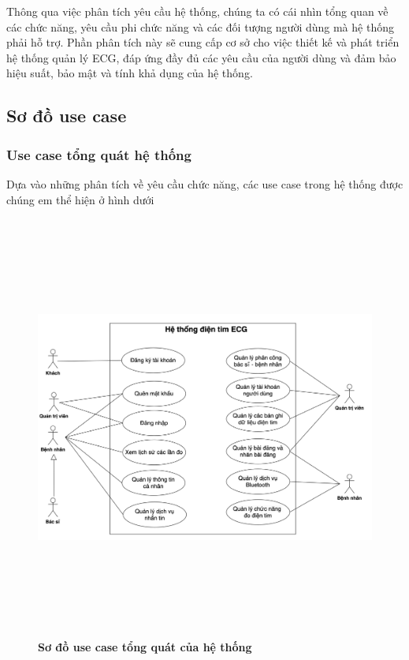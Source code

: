 Thông qua việc phân tích yêu cầu hệ thống, chúng ta có cái nhìn tổng quan về các chức năng, yêu cầu phi chức năng và 
các đối tượng người dùng mà hệ thống phải hỗ trợ. Phần phân tích này sẽ cung cấp cơ sở cho việc thiết kế và phát triển hệ thống quản lý ECG, 
đáp ứng đầy đủ các yêu cầu của người dùng và đảm bảo hiệu suất, bảo mật và tính khả dụng của hệ thống.

\subsection{Sơ đồ use case}
\subsubsection{Use case tổng quát hệ thống}
Dựa vào những phân tích về yêu cầu chức năng, các use case trong hệ thống được chúng em thể hiện ở hình dưới 
  \begin{figure}[H]
    \centering
    \includegraphics[width=17cm,height=14cm]{Images/use_case/use_case_general.png}
    \caption[Sơ đồ use case tổng quát của hệ thống]{\bfseries \fontsize{12pt}{0pt}
    \selectfont Sơ đồ use case tổng quát của hệ thống}
    \label{use_case_general} %
  \end{figure}

